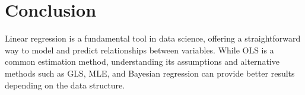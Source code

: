 \documentclass{article}
\begin{document}
\newpage
\section{Conclusion}

Linear regression is a fundamental tool in data science, offering a straightforward way to model and predict relationships between variables. While OLS is a common estimation method, understanding its assumptions and alternative methods such as GLS, MLE, and Bayesian regression can provide better results depending on the data structure.
\end{document}
